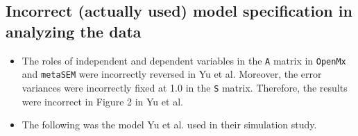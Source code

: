 \documentclass[]{article}
\providecommand{\tightlist}{%
  \setlength{\itemsep}{0pt}\setlength{\parskip}{0pt}}
\begin{document}
\subsection{Incorrect (actually used) model specification in analyzing
the
data}\label{incorrect-actually-used-model-specification-in-analyzing-the-data-1}

\begin{itemize}
\tightlist
\item
  The roles of independent and dependent variables in the \texttt{A}
  matrix in \texttt{OpenMx} and \texttt{metaSEM} were incorrectly
  reversed in Yu et al. Moreover, the error variances were incorrectly
  fixed at 1.0 in the \texttt{S} matrix. Therefore, the results were
  incorrect in Figure 2 in Yu et al.
\item
  The following was the model Yu et al. used in their simulation study.
\end{itemize}
\end{document}
